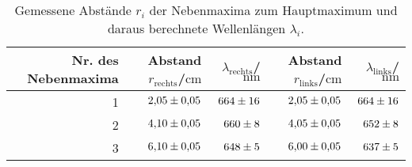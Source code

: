 \begin{table}
 \caption{Gemessene Abstände $r_i$ der Nebenmaxima zum Hauptmaximum und daraus berechnete Wellenlängen $\lambda_i$.}
 \label{tab:wellenlaenge}
 \centering
{} \begin{tabular}{rrrrr}
 \toprule 
    {Nr. des Nebenmaxima}& {Abstand $r_{\mathrm{rechts}}$/$\si{\centi\meter}$}& {$\lambda_{\mathrm{rechts}}$/$\si{\nano\meter}$}& {Abstand $r_{\mathrm{links}}$/$\si{\centi\meter}$}& {$\lambda_{\mathrm{links}}$/$\si{\nano\meter}$} \\
     \midrule
              1 & $\num{2.05 \pm 0.05}$ & $\num{664 \pm 16}$ & $\num{2.05 \pm 0.05}$ & $\num{664\pm16}$ \\
              2 & $\num{4.10 \pm 0.05}$ & $\num{660 \pm 8}$ & $\num{4.05 \pm 0.05}$ & $\num{652\pm8}$ \\
              3 & $\num{6.10 \pm 0.05}$ & $\num{648 \pm 5}$ & $\num{6.00 \pm 0.05}$ & $\num{637\pm5}$ \\
 \bottomrule
 \end{tabular}
\end{table}